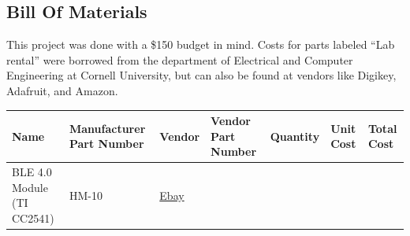 \documentclass[]{article}
\begin{document}
\begin{appendices}
  \section{Bill Of Materials}
  This project was done with a \$150 budget in mind. Costs for parts labeled ``Lab rental'' were borrowed from the department of Electrical and Computer Engineering at Cornell University, but can also be found at vendors like Digikey, Adafruit, and Amazon.

  \begin{centering}
  \tiny
  \begin{longtable}[]{@{}lllllll@{}}
  \toprule
  \begin{minipage}[b]{0.15\columnwidth}\raggedright
  Name\strut
  \end{minipage} & \begin{minipage}[b]{0.15\columnwidth}\raggedright
  Manufacturer Part Number\strut
  \end{minipage} & \begin{minipage}[b]{0.10\columnwidth}\raggedright
  Vendor\strut
  \end{minipage} & \begin{minipage}[b]{0.17\columnwidth}\raggedright
  Vendor Part Number\strut
  \end{minipage} & \begin{minipage}[b]{0.11\columnwidth}\raggedright
  Quantity\strut
  \end{minipage} & \begin{minipage}[b]{0.06\columnwidth}\raggedright
  Unit Cost\strut
  \end{minipage} & \begin{minipage}[b]{0.07\columnwidth}\raggedright
  Total Cost\strut
  \end{minipage}\tabularnewline
  \midrule
  \endhead
  \begin{minipage}[t]{0.15\columnwidth}\raggedright
  BLE 4.0 Module (TI CC2541)\strut
  \end{minipage} & \begin{minipage}[t]{0.15\columnwidth}\raggedright
  HM-10\strut
  \end{minipage} & \begin{minipage}[t]{0.10\columnwidth}\raggedright
  \href{https://www.ebay.com/itm/AT-09-BLE-Bluetooth-4-0-Uart-Transceiver-Module-CC2541-Central-Switching-HM-10/142425748901?ssPageName=STRK\%3AMEBIDX\%3AIT\&_trksid=p2057872.m2749.l2649}{Ebay}\strut
  \end{minipage} & \begin{minipage}[t]{0.17\columnwidth}\raggedright

\end{minipage}
\end{longtable}
\end{centering}
\end{appendices}
\end{document}
